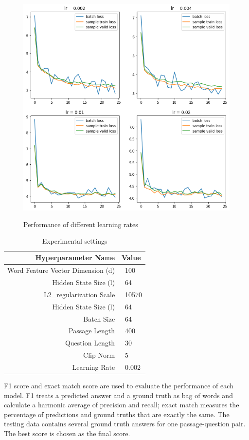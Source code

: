 \documentclass[modernstyle,12pt]{sjsuthesis}
\theoremstyle{definition}
\begin{document}
\begin{figure}[htbp]\centering
  \includegraphics[width=12cm, height=12cm]{figures/lr.png}
  \caption{Performance of different learning rates}
  \label{f:lr}
\end{figure}

\begin{table}[htbp]\centering
  \caption{Experimental settings}
  \label{tab:settings}
  \begin{tabular}{|r|l|} \hline
    Hyperparameter Name& Value \\ \hline\hline
    Word Feature Vector Dimension (d) & \ 100 \\
    Hidden State Size (l) & \ 64 \\
    L2\_regularization Scale & \ 10570\\
    Hidden State Size (l) & \ 64\\
    Batch Size & \ 64\\
    Passage Length & \ 400\\
    Question Length & \ 30\\
    Clip Norm & \ 5\\
    Learning Rate & \ 0.002 \\ \hline
  \end{tabular}
\end{table}

F1 score and exact match score are used to evaluate the performance of each model. F1 treats a predicted answer and a ground truth as bag of words and calculate a harmonic average of precision and recall; exact match measures the percentage of predictions and ground truths that are exactly the same. The testing data contains several ground truth answers for one passage-question pair. The best score is chosen as the final score.
\end{document}
